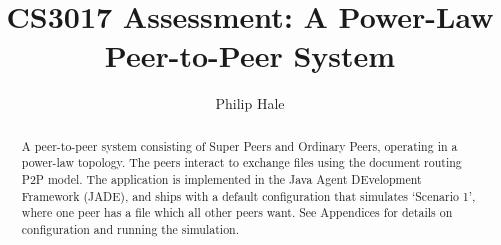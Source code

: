 \documentclass[a4paper,oneside]{article}
\author{Philip Hale}
\title{CS3017 Assessment: A Power-Law Peer-to-Peer System}
\begin{document}
\begin{titlepage}
  \maketitle
  \begin{abstract}
  A peer-to-peer system consisting of Super Peers and Ordinary Peers, operating
  in a power-law topology. The peers interact to exchange files using the
  document routing P2P model. The application is implemented in the Java Agent
  DEvelopment Framework (JADE), and ships with a default configuration that
  simulates `Scenario 1', where one peer has a file which all other peers want.
  See Appendices for details on configuration and running the simulation.
  \end{abstract}
  \dosecttoc
  \tableofcontents
\end{titlepage}





\begin{appendices}
  
\end{appendices}
\end{document}
